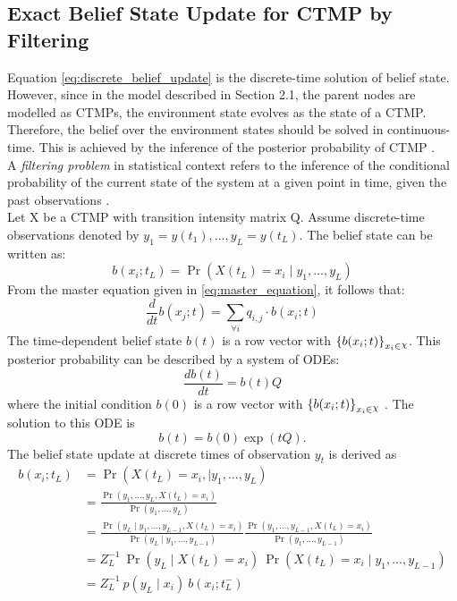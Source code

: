 \subsection{Exact Belief State Update for CTMP by Filtering}
\label{sec:filtering_CTMC}
Equation \ref{eq:discrete_belief_update} is the discrete-time solution of belief state. However, since in the model described in Section 2.1, the parent nodes are modelled as CTMPs, the environment state evolves as the state of a CTMP. Therefore, the belief over the environment states should be solved in continuous-time. This is achieved by the inference of the posterior probability of CTMP \cite{article}.\\
A \textit{filtering problem} in statistical context refers to the inference of the conditional probability of the current state of the system at a given point in time, given the past observations \cite{Godsill2019}.\\
Let X be a CTMP with transition intensity matrix Q. Assume discrete-time observations denoted by $ y_{1}=y(t_{1}), ..., y_{L}=y(t_{L}) $. The belief state can be written as:
\begin{equation}
b(x_{i};t_{L}) = \operatorname{Pr}(X(t_{L}) = x_{i} \mid y_{1}, ..., y_{L})
\end{equation}
From the master equation given in \autoref{eq:master_equation}, it follows that:
\begin{equation}
\frac{d}{dt} b(x_{j};t)  = \sum_{\forall i} q_{i,j} \cdot b(x_{i};t)
\end{equation}
The time-dependent belief state $ b(t) $ is a row vector with $ \left\lbrace b(x_{i};t)\right\rbrace_{x_{i} \in \rchi}  $.
This posterior probability can be described by a system of ODEs:
\begin{equation}
\frac{db(t)}{dt} = b(t)Q
\end{equation}
where the initial condition $ b(0) $ is a row vector with $ \left\lbrace b(x_{i};t)\right\rbrace_{x_{i} \in \rchi} $ \cite{article}. The solution to this ODE is
\begin{equation}
b(t) = b(0) \exp(tQ).
\label{eq:b_cont}
\end{equation}
The belief state update at discrete times of observation $ y_{t} $ is derived as 
\begin{align}
b(x_{i}; t_{L}) & = \operatorname{Pr}( X(t_{L}) = x_{i},\mid y_{1}, ..., y_{L}) \nonumber\\ & = \frac{\operatorname{Pr}(y_{1}, ..., y_{L}, X(t_{L}) = x_{i})}{\operatorname{Pr}(y_{1}, ..., y_{L})}  \nonumber\\ & = \frac{\operatorname{Pr}(y_{L} \mid y_{1}, ..., y_{L-1}, X(t_{L}) = x_{i})}{\operatorname{Pr}(y_{L} \mid y_{1}, ..., y_{L-1})} \frac{\operatorname{Pr}(y_{1}, ..., y_{L-1}, X(t_{L}) = x_{i})}{\operatorname{Pr}(y_{1}, ..., y_{L-1})}  \nonumber\\ & = Z_{L}^{-1} \ \operatorname{Pr}(y_{L} \mid X(t_{L})=x_{i})\ \operatorname{Pr}( X(t_{L}) = x_{i}\mid y_{1}, ..., y_{L-1})  \nonumber\\ & = Z_{L}^{-1}\ {p(y_{L} \mid x_{i})}\ {b(x_{i}; t_{L}^{-})}
\label{eq:b_jump}
\end{align}
